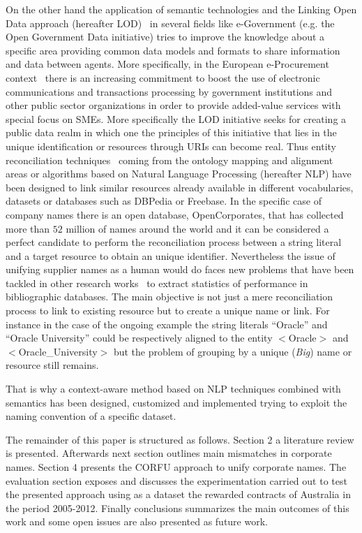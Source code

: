 \documentclass{llncs}
\begin{document}
On the other hand the application of semantic technologies and the Linking Open Data approach (hereafter LOD)~\cite{Berners-Lee-2006,Heath_Bizer_2011}  
in several fields like e-Government (e.g. the Open Government Data initiative) tries to improve the knowledge about a specific area providing 
common data models and formats to share information and data between agents. More specifically, in the European e-Procurement 
context~\cite{e-Proc-map-paper} there is an increasing commitment to boost the use of electronic communications and transactions 
processing by government institutions and other public sector organizations in order to provide added-value services with special focus on SMEs. 
More specifically the LOD initiative seeks for creating a public data realm in which one the principles of this initiative that lies in the 
unique identification or resources through URIs can become real. Thus entity reconciliation techniques~\cite{Serimi,conf/www/MaaliCP11} 
coming from the ontology mapping and alignment areas or algorithms based on Natural Language Processing (hereafter NLP) have been 
designed to link similar resources already available in different vocabularies, datasets or databases such as DBPedia or Freebase. 
In the specific case of company names there is an open database, OpenCorporates, that has collected more than $52$ million of names 
around the world and it can be considered a perfect candidate to perform the reconciliation process between a string literal and a 
target resource to obtain an unique identifier. Nevertheless the issue of unifying supplier names as a human would do 
faces new  problems that have been tackled in other research works~\cite{Galvez2006} to extract statistics of performance in bibliographic databases. 
The main objective is not just a mere reconciliation process to link to existing resource but to create a unique name or link. For instance in the case 
of the ongoing example the string literals ``Oracle'' and ``Oracle University'' could be respectively aligned to the entity $<$Oracle$>$ and $<$Oracle\_University$>$ but 
the problem of grouping by a unique (\textit{Big}) name or resource still remains. 

That is why a context-aware method based on NLP techniques combined with semantics has been designed, customized and implemented trying 
to exploit the naming convention of a specific dataset.

The remainder of this paper is structured as follows. Section 2 a literature review is presented. Afterwards next section outlines main mismatches in corporate names. Section 4 presents 
the CORFU approach to unify corporate names. The evaluation section exposes and discusses the experimentation carried out to test the presented approach using as a dataset the rewarded 
contracts of Australia in the period 2005-2012. Finally conclusions summarizes the main outcomes of this work 
and some open issues are also presented as future work.
\end{document}
